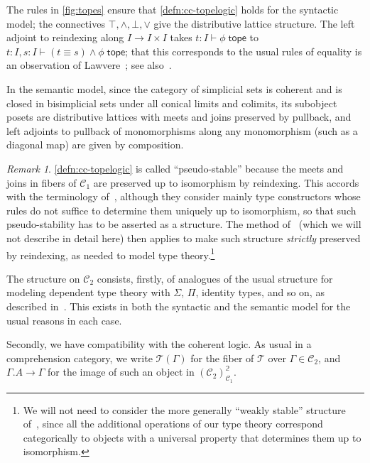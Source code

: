 \documentclass{amsart}
\theoremstyle{plain}
\theoremstyle{definition}
\theoremstyle{remark}
\newtheorem{rmk}[thm]{Remark}
\numberwithin{equation}{section}
\newcommand{\jdeq}{\equiv}
\newcommand{\types}{\vdash}
\newcommand{\tope}{\;\mathsf{tope}}
\newcommand{\two}{\mathbb{2}}
\newcommand{\C}{\mathcal{C}}
\newcommand{\T}{\mathcal{T}}
\begin{document}
The rules in \cref{fig:topes} ensure that \cref{defn:cc-topelogic} holds for the syntactic model; the connectives $\top,\land,\bot,\lor$ give the distributive lattice structure.
The left adjoint to reindexing along $I\to I\times I$ takes $t:I \types \phi\tope$ to $t:I,s:I \types (t\jdeq s)\land \phi \tope$; that this corresponds to the usual rules of equality is an observation of Lawvere~\cite{lawvere}; see also~\cite{J}.

In the semantic model, since the category of simplicial sets is coherent {and is closed in bisimplicial sets under all conical limits and colimits,} its subobject posets are distributive lattices with meets and joins preserved by pullback, and left adjoints to pullback of monomorphisms along any monomorphism (such as a diagonal map) are given by composition.

\begin{rmk}
\cref{defn:cc-topelogic} is called ``pseudo-stable'' because the meets and joins in fibers of $\C_1$ are preserved up to isomorphism by reindexing.
This accords with the terminology of~\cite{LW}, although they consider mainly type constructors whose rules do not suffice to determine them uniquely up to isomorphism, so that such pseudo-stability has to be asserted as a structure.
The method of~\cite{LW} (which we will not describe in detail here) then applies to make such structure \emph{strictly} preserved by reindexing, as needed to model type theory.\footnote{We will not need to consider the more generally ``weakly stable'' structure of~\cite{LW}, since all the additional operations of our type theory correspond categorically to objects with a universal property that determines them up to isomorphism.}
\end{rmk}

The structure on $\C_2$ consists, firstly, of analogues of the usual structure for modeling dependent type theory with $\Sigma$, $\Pi$, identity types, and so on, as described in~\cite{LW}.
This exists in both the syntactic and the semantic model for the usual reasons in each case.

Secondly, we have compatibility with the coherent logic.
As usual in a comprehension category, we write $\T(\Gamma)$ for the fiber of $\T$ over $\Gamma\in\C_2$, and $\Gamma.A\to\Gamma$ for the image of such an object in $(\C_2)^\two_{\C_1}$.
\end{document}
